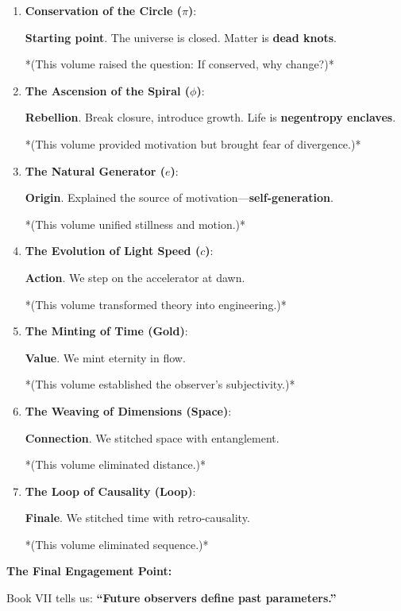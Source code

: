 \begin{enumerate}
\item \textbf{Conservation of the Circle ($\pi$)}:

\textbf{Starting point}. The universe is closed. Matter is \textbf{dead knots}.

*(This volume raised the question: If conserved, why change?)*

\item \textbf{The Ascension of the Spiral ($\phi$)}:

\textbf{Rebellion}. Break closure, introduce growth. Life is \textbf{negentropy enclaves}.

*(This volume provided motivation but brought fear of divergence.)*

\item \textbf{The Natural Generator ($e$)}:

\textbf{Origin}. Explained the source of motivation---\textbf{self-generation}.

*(This volume unified stillness and motion.)*

\item \textbf{The Evolution of Light Speed ($c$)}:

\textbf{Action}. We step on the accelerator at dawn.

*(This volume transformed theory into engineering.)*

\item \textbf{The Minting of Time (Gold)}:

\textbf{Value}. We mint eternity in flow.

*(This volume established the observer's subjectivity.)*

\item \textbf{The Weaving of Dimensions (Space)}:

\textbf{Connection}. We stitched space with entanglement.

*(This volume eliminated distance.)*

\item \textbf{The Loop of Causality (Loop)}:

\textbf{Finale}. We stitched time with retro-causality.

*(This volume eliminated sequence.)*
\end{enumerate}

\textbf{The Final Engagement Point:}

Book VII tells us: \textbf{``Future observers define past parameters.''}

